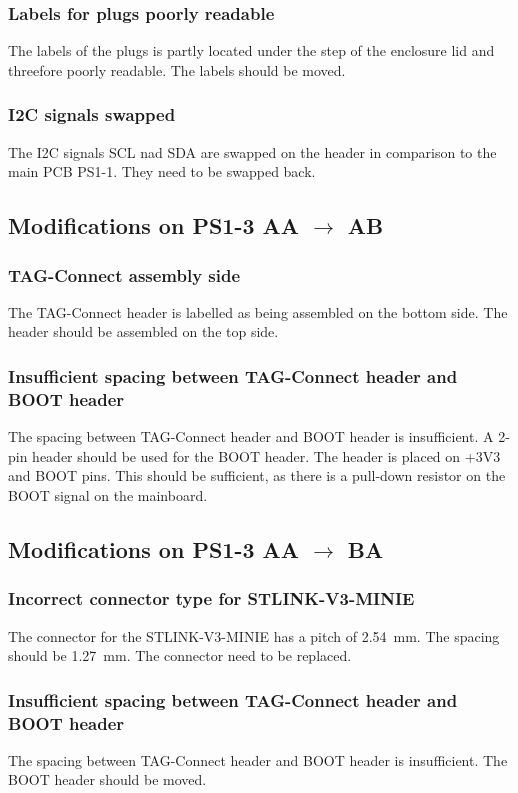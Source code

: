 \subsubsection{Labels for plugs poorly readable}
The labels of the plugs is partly located under the step of the enclosure lid and threefore poorly readable. The labels should be moved. 

\subsubsection{\acs{I2C} signals swapped}
The \ac{I2C} signals SCL nad SDA are swapped on the header in comparison to the main PCB PS1-1. They need to be swapped back. 

\subsection{Modifications on PS1-3 AA $\to$ AB}

\subsubsection{TAG-Connect assembly side}
The TAG-Connect header is labelled as being assembled on the bottom side. The header should be assembled on the top side. 

\subsubsection{Insufficient spacing between TAG-Connect header and BOOT header}
The spacing between TAG-Connect header and BOOT header is insufficient. A 2-pin header should be used for the BOOT header. The header is placed on +3V3 and BOOT pins. This should be sufficient, as there is a pull-down resistor on the BOOT signal on the mainboard. 

\subsection{Modifications on PS1-3 AA $\to$ BA}

\subsubsection{Incorrect connector type for STLINK-V3-MINIE}
The connector for the STLINK-V3-MINIE has a pitch of \qty{2.54}{\milli\meter}. The spacing should be \qty{1.27}{\milli\meter}. The connector need to be replaced. 

\subsubsection{Insufficient spacing between TAG-Connect header and BOOT header}
The spacing between TAG-Connect header and BOOT header is insufficient. The BOOT header should be moved. 

